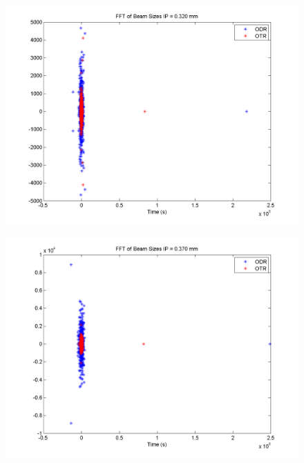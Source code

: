 \documentclass[12pt]{article}
\begin{document}
\begin{figure}
\begin{center}
\includegraphics[scale=0.5]{Figures/FFT_320.PNG}
\caption{}
\end{center}
\end{figure}

\begin{figure}
\begin{center}
\includegraphics[scale=0.5]{Figures/FFT_370.PNG}
\caption{}
\end{center}
\end{figure}
\end{document}
